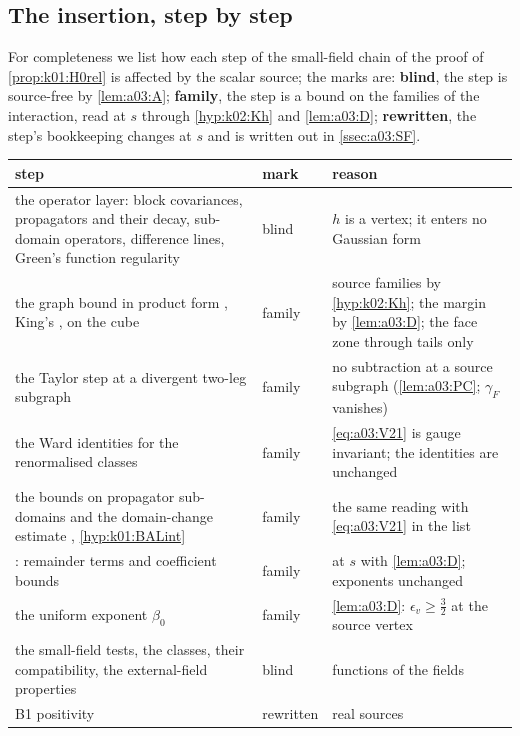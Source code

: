\subsection{The insertion, step by step}\label{ssec:a03:census}

For completeness we list how each step of the small-field chain of the proof of \cref{prop:k01:H0rel} is affected by the scalar source; the marks are: \textbf{blind}, the step is source-free by \cref{lem:a03:A}; \textbf{family}, the step is a bound on the families of the interaction, read at $s$ through \cref{hyp:k02:Kh} and \cref{lem:a03:D}; \textbf{rewritten}, the step's bookkeeping changes at $s$ and is written out in \cref{ssec:a03:SF}.

\begin{center}\small
\begin{tabular}{p{}lp{}}
\hline
step & mark & reason \\
\hline
the operator layer: block covariances, propagators and their decay, sub-domain operators, difference lines, Green's function regularity \cite{Ba4} & blind & $h$ is a vertex; it enters no Gaussian form \\
the graph bound in product form \cite[Prop.~1]{Ba3}, King's \cite[(3.38)]{K1}, on the cube & family & source families by \cref{hyp:k02:Kh}; the margin by \cref{lem:a03:D}; the face zone through tails only \\
the Taylor step at a divergent two-leg subgraph & family & no subtraction at a source subgraph (\cref{lem:a03:PC}; $\gamma_F$ vanishes) \\
the Ward identities for the renormalised classes & family & \eqref{eq:a03:V21} is gauge invariant; the identities are unchanged \\
the bounds on propagator sub-domains and the domain-change estimate \cite[Prop.~2.6]{Ba2}, \cref{hyp:k01:BALint} & family & the same reading with \eqref{eq:a03:V21} in the list \\
\cite[Props.~3.1--3.2]{Ba1}: remainder terms and coefficient bounds & family & at $s$ with \cref{lem:a03:D}; exponents unchanged \\
the uniform exponent $\beta_0$ & family & \cref{lem:a03:D}: $\epsilon_v\ge\frac32$ at the source vertex \\
the small-field tests, the classes, their compatibility, the external-field properties & blind & functions of the fields \\
B1 positivity & rewritten & real sources \\

\end{tabular}
\end{center}
